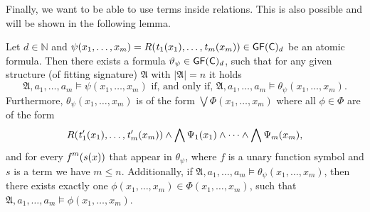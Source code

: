Finally, we want to be able to use terms inside relations.
This is also possible and will be shown in the following lemma.

\begin{lemma}
	Let $d\in\mathbb N$ and $\psi(x_1,\dots,x_m)= R(\operatorname{\mathit{t}}_1(x_1),\dots,\operatorname{\mathit{t}}_m(x_m))\in \mathsf{GF}(\mathsf{C})_d$ be an atomic formula.
	Then there exists a formula $\vartheta_\psi\in\mathsf{GF}(\mathsf{C})_d$, such that for any given structure (of fitting signature) $\mathfrak A$ with $\vert\mathfrak A \vert=n$ it holds
	$$\mathfrak A,a_1,\dots,a_m\models \psi(x_1,\dots,x_m) \text{ if, and only if, } \mathfrak A,a_1,\dots,a_m\models \theta_\psi(x_1,\dots,x_m).$$
	Furthermore, $\theta_\psi(x_1,\dots,x_m)$ is of the form $\bigvee \Phi(x_1,\dots,x_m)$ where all $\phi\in\Phi$ are of the form
	$$R(\operatorname{\mathit{t}}_1'(x_1),\dots,\operatorname{\mathit{t}}_m'(x_m))\land \bigwedge\Psi_1(x_1)\land \dots\land\bigwedge \Psi_m(x_m),$$
	and for every $\operatorname{\mathit{f}}^m(s(x))$ that appear in $\theta_\psi$, where $f$ is a unary function symbol and $s$ is a term we have $m\leq n$.
	Additionally, if $\mathfrak A,a_1,\dots,a_m\models \theta_\psi(x_1,\dots,x_m)$, then there exists exactly one $\phi(x_1,\dots,x_m)\in\Phi(x_1,\dots,x_m)$, such that $\mathfrak A,a_1,\dots,a_m\models \phi(x_1,\dots,x_m)$.
	\label{TranslationOfArbAtomics}
\end{lemma}
